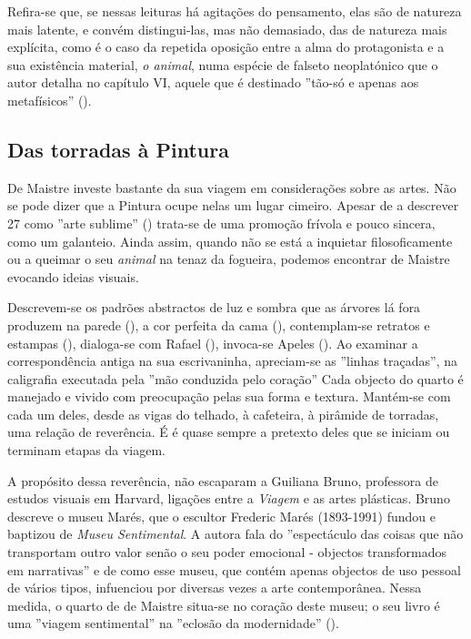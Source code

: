 \documentclass[12pt]{article}
\begin{document}
Refira-se que, se nessas leituras há agitações do pensamento, elas são
de natureza mais latente, e convém distingui-las, mas não demasiado,
das de natureza mais explícita, como é o caso da repetida oposição
entre a alma do protagonista e a sua existência material, \emph{o
  animal}, numa espécie de falseto neoplatónico que o autor detalha no
capítulo VI, aquele que é destinado ''tão-só e apenas aos
metafísicos'' (\cite[p.25]{demaistre}).

\subsection{Das torradas à Pintura}

De Maistre investe bastante da sua viagem em considerações sobre as
artes. Não se pode dizer que a Pintura ocupe nelas um lugar
cimeiro. Apesar de a descrever 27 como ''arte sublime''
(\cite[p.27]{demaistre}) trata-se de uma promoção frívola e pouco
sincera, como um galanteio. Ainda assim, quando não se está a
inquietar filosoficamente ou a queimar o seu \emph{animal} na tenaz da
fogueira, podemos encontrar de Maistre evocando ideias visuais.

Descrevem-se os padrões abstractos de luz e sombra que as árvores lá
fora produzem na parede (\cite[p.23]{demaistre}), a cor perfeita da
cama (\cite[p.53]{demaistre}), contemplam-se retratos e estampas
(\cite[p.34]{demaistre}), dialoga-se com Rafael
(\cite[p.65]{demaistre}), invoca-se Apeles
(\cite[p.69]{demaistre}). Ao examinar a correspondência antiga na sua
escrivaninha, apreciam-se as ''linhas traçadas'', na caligrafia
executada pela ''mão conduzida pelo coração'' \cite[p.84]{demaistre}
Cada objecto do quarto é manejado e vivido com preocupação pelas sua
forma e textura. Mantém-se com cada um deles, desde as vigas do
telhado, à cafeteira, à pirâmide de torradas, uma relação de
reverência. É é quase sempre a pretexto deles que se iniciam ou
terminam etapas da viagem.

A propósito dessa reverência, não escaparam a Guiliana Bruno,
professora de estudos visuais em Harvard, ligações entre a
\emph{Viagem} e as artes plásticas. Bruno descreve o museu Marés, que
o escultor Frederic Marés (1893-1991) fundou e baptizou de \emph{Museu
  Sentimental}. A autora fala do ''espectáculo das coisas que não
transportam outro valor senão o seu poder emocional - objectos
transformados em narrativas'' e de como esse museu, que contém apenas
objectos de uso pessoal de vários tipos, infuenciou por diversas vezes
a arte contemporânea. Nessa medida, o quarto de de Maistre situa-se no
coração deste museu; o seu livro é uma ''viagem sentimental'' na
''eclosão da modernidade'' (\cite[p.133]{bruno2002atlas}).
\end{document}
